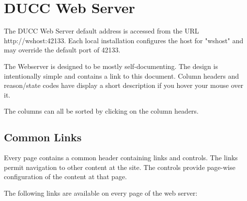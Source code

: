 \ifpdf
\else
{}
\fi
\chapter{DUCC Web Server}

    The DUCC Web Server default address is accessed from the URL http://wshost:42133. Each local
    installation configures the host for "wshost" and may override the default port of 42133.

    The Webserver is designed to be mostly self-documenting. The design is intentionally simple 
    and contains a link to this document. Column headers and reason/state codes have display a short 
    description if you hover your mouse over it. 

    The columns can all be sorted by clicking on the column headers. 

\ifpdf
\else
{}
\fi
    \section{Common Links}

        Every page contains a common header containing links and controls. The links permit navigation
        to other content at the site. The controls provide page-wise configuration of the content at
        that page.

        The following links are available on every page of the web server: 


